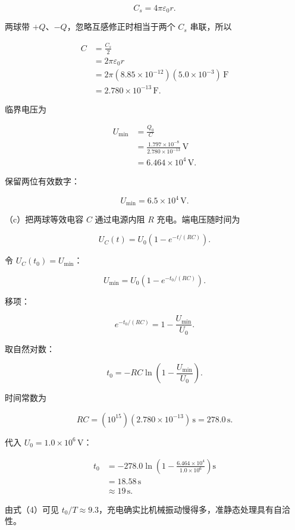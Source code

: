 \documentclass[12pt,a4paper,UTF8]{ctexart}
\begin{document}
\[
C_s=4\pi\varepsilon_0r. \tag{21}
\]

两球带 \(+Q\)、\(-Q\)，忽略互感修正时相当于两个 \(C_s\) 串联，所以

\[
\begin{aligned}
C
&=\frac{C_s}{2}\\
&=2\pi\varepsilon_0r\\
&=2\pi(8.85\times10^{-12})(5.0\times10^{-3})\,\mathrm F\\
&=2.780\times10^{-13}\,\mathrm F.
\end{aligned} \tag{22}
\]

临界电压为

\[
\begin{aligned}
U_{\min}
&=\frac{Q_0}{C}\\
&=\frac{1.797\times10^{-8}}{2.780\times10^{-13}}\,\mathrm V\\
&=6.464\times10^4\,\mathrm V.
\end{aligned} \tag{23}
\]

保留两位有效数字：

\[
\boxed{U_{\min}=6.5\times10^4\,\mathrm V}. \tag{24}
\]

（c）把两球等效电容 \(C\) 通过电源内阻 \(R\) 充电。端电压随时间为

\[
U_C(t)=U_0\left(1-e^{-t/(RC)}\right). \tag{25}
\]

令 \(U_C(t_0)=U_{\min}\)：

\[
U_{\min}
=U_0\left(1-e^{-t_0/(RC)}\right). \tag{26}
\]

移项：

\[
e^{-t_0/(RC)}
=1-\frac{U_{\min}}{U_0}. \tag{27}
\]

取自然对数：

\[
t_0
=-RC\ln\left(1-\frac{U_{\min}}{U_0}\right). \tag{28}
\]

时间常数为

\[
RC=(10^{15})(2.780\times10^{-13})\,\mathrm s
=278.0\,\mathrm s. \tag{29}
\]

代入 \(U_0=1.0\times10^6\,\mathrm V\)：

\[
\begin{aligned}
t_0
&=-278.0\ln\left(1-\frac{6.464\times10^4}{1.0\times10^6}\right)\mathrm s\\
&=18.58\,\mathrm s\\
&\approx\boxed{19\,\mathrm s}.
\end{aligned} \tag{30}
\]

由式（4）可见
\(t_0/T\approx9.3\)，充电确实比机械振动慢得多，准静态处理具有自洽性。
\end{document}
